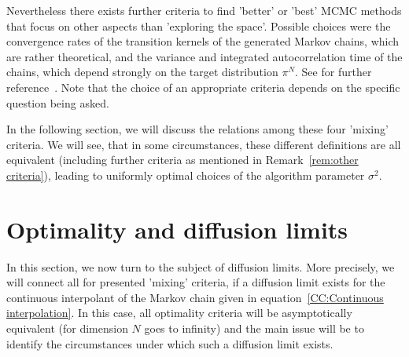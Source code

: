 \begin{rem}\label{rem:other criteria}
Nevertheless there exists further criteria to find 'better' or 'best' MCMC methods that focus on other aspects than 'exploring the space'. Possible choices were the convergence rates of the transition kernels of the generated Markov chains, which are rather theoretical, and the variance and integrated autocorrelation time of the chains, which depend strongly on the target distribution $ \pi^{N} $. See for further reference~\autocite{Rosenthal2008}. Note that the choice of an appropriate criteria depends on the specific question being asked. 
\end{rem}

In the following section, we will discuss the relations among these four 'mixing' criteria. We will see, that in some circumstances, these different definitions are all equivalent (including further criteria as mentioned in Remark~\ref{rem:other criteria}), leading to uniformly optimal choices of the algorithm parameter $\sigma^2$.


\section{Optimality and diffusion limits}
\label{CC:Optimality and Diffusion Limits}

In this section, we now turn to the subject of diffusion limits. More precisely, we will connect all for presented 'mixing' criteria, if a diffusion limit exists for the continuous interpolant of the Markov chain given in equation~\ref{CC:Continuous interpolation}. In this case, all optimality criteria will be asymptotically equivalent (for dimension $N$ goes to infinity) and the main issue will be to identify the circumstances under which such a diffusion limit exists.

